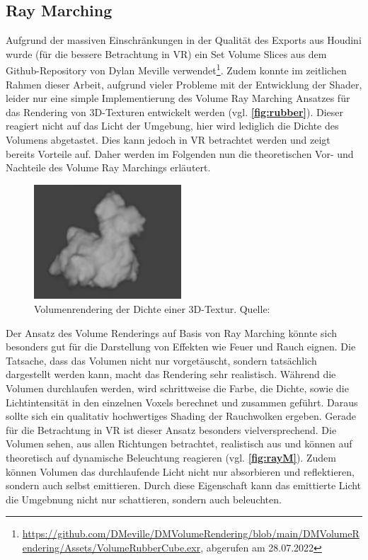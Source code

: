 \subsection{Ray Marching}
\label{sec:5.2}

Aufgrund der massiven Einschränkungen in der Qualität des Exports aus Houdini wurde (für die bessere Betrachtung in VR) ein Set Volume Slices aus dem 
Github-Repository von Dylan Meville verwendet\footnote{\url{https://github.com/DMeville/DMVolumeRendering/blob/main/DMVolumeRendering/Assets/VolumeRubberCube.exr}, abgerufen am 28.07.2022}.
Zudem konnte im zeitlichen Rahmen dieser Arbeit, aufgrund vieler Probleme mit der Entwicklung der Shader, leider nur eine simple Implementierung des Volume Ray Marching Ansatzes für das Rendering 
von 3D-Texturen entwickelt werden (vgl. \textbf{\autoref{fig:rubber}}). Dieser reagiert nicht auf das Licht der Umgebung, hier wird lediglich die Dichte des Volumens abgetastet. 
Dies kann jedoch in VR betrachtet werden und zeigt bereits Vorteile auf.  
Daher werden im Folgenden nun die theoretischen Vor- und Nachteile des Volume Ray Marchings erläutert.

\begin{figure}[h!]
	\includegraphics[width=0.49\textwidth]{Grafiken/Evaluation/raymarch/rubberDuck.png}
	\centering
	\begin{footnotesize}
		\caption{Volumenrendering der Dichte einer 3D-Textur. Quelle: \parencite{Shaderbits:Volume}}
		\label{fig:rubber}
	\end{footnotesize}
\end{figure}

Der Ansatz des Volume Renderings auf Basis von Ray Marching könnte sich besonders gut für die Darstellung von Effekten wie Feuer und Rauch eignen. 
Die Tatsache, dass das Volumen nicht nur vorgetäuscht, sondern tatsächlich dargestellt werden kann, macht das Rendering sehr realistisch. 
Während die Volumen durchlaufen werden, wird schrittweise die Farbe, die Dichte, sowie die Lichtintensität in den einzelnen Voxels berechnet und zusammen geführt. 
Daraus sollte sich ein qualitativ hochwertiges Shading der Rauchwolken ergeben. Gerade für die Betrachtung in VR ist dieser Ansatz besonders vielversprechend. 
Die Volumen sehen, aus allen Richtungen betrachtet, realistisch aus und können auf theoretisch auf dynamische Beleuchtung reagieren (vgl. \textbf{\autoref{fig:rayM}}). 
Zudem können Volumen das durchlaufende Licht nicht nur absorbieren und reflektieren, sondern auch selbst emittieren. Durch diese Eigenschaft kann das
emittierte Licht die Umgebnung nicht nur schattieren, sondern auch beleuchten. 


